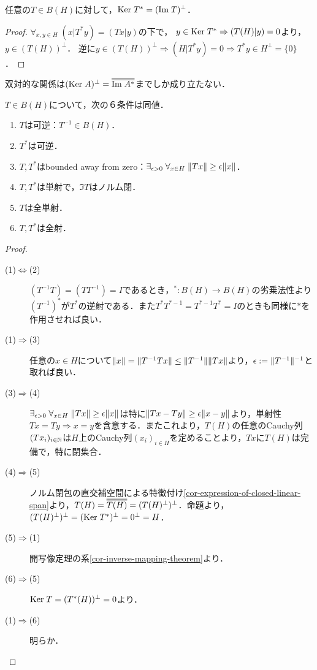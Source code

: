 \documentclass[uplatex,dvipdfmx]{jsreport}
\begin{document}
\begin{proposition}\label{prop-Ker-of-adjoint-operator}
    任意の$T\in B(H)$に対して，$\mathrm{Ker}\; T^*=(\mathrm{Im}\; T)^\perp$．
\end{proposition}
\begin{proof}
    $\forall_{x,y\in H}\;(x|T^*y)=(Tx|y)$の下で，
    $y\in\mathrm{Ker}\; T^*\Rightarrow (T(H)|y)=0$より，$y\in(T(H))^\perp$．
    逆に$y\in(T(H))^\perp\Rightarrow (H|T^*y)=0\Rightarrow T^*y\in H^\perp=\{0\}$．
\end{proof}
\begin{remark}
    双対的な関係は$(\Ker A)^\perp=\oo{\Im A^*}$までしか成り立たない．
\end{remark}

\begin{proposition}\label{prop-characterization-of-invertibleness-of-operator}
    $T\in B(H)$について，次の６条件は同値．
    \begin{enumerate}
        \item $T$は可逆：$T^{-1}\in B(H)$．
        \item $T^*$は可逆．
        \item $T,T^*$はbounded away from zero：$\exists_{\epsilon>0}\;\forall_{x\in H}\;\|Tx\|\ge\epsilon\|x\|$．%
        \item $T,T^*$は単射で，$\Im T$はノルム閉．
        \item $T$は全単射．
        \item $T,T^*$は全射．
    \end{enumerate}
\end{proposition}
\begin{proof}\mbox{}
    \begin{description}
        \item[(1)$\Leftrightarrow$(2)] $(T^{-1}T)=(TT^{-1})=I$であるとき，${}^*:B(H)\to B(H)$の劣乗法性より$(T^{-1})^*$が$T^*$の逆射である．また$T^*T^{*-1}=T^{*-1}T^*=I$のときも同様に$*$を作用させれば良い．
        \item[(1)$\Rightarrow$(3)] 任意の$x\in H$について$\|x\|=\|T^{-1}Tx\|\le\|T^{-1}\|\|Tx\|$より，$\epsilon:=\|T^{-1}\|^{-1}$と取れば良い．
        \item[(3)$\Rightarrow$(4)] $\exists_{\epsilon>0}\;\forall_{x\in H}\;\|Tx\|\ge\epsilon\|x\|$は特に$\|Tx-Ty\|\ge\epsilon\|x-y\|$より，単射性$Tx=Ty\Rightarrow x=y$を含意する．またこれより，$T(H)$の任意のCauchy列$(Tx_i)_{i\in\mathbb{N}}$は$H$上のCauchy列$(x_i)_{i\in H}$を定めることより，$Tx$に$T(H)$は完備で，特に閉集合．
        \item[(4)$\Rightarrow$(5)] ノルム閉包の直交補空間による特徴付け\ref{cor-expression-of-closed-linear-span}より，$T(H)=\dbloverline{T(H)}=(T(H)^\perp)^\perp$．命題より，$(T(H)^\perp)^\perp=(\mathrm{Ker}\; T^*)^\perp=0^\perp=H$．
        \item[(5)$\Rightarrow$(1)] 開写像定理の系\ref{cor-inverse-mapping-theorem}より．
        \item[(6)$\Rightarrow$(5)] $\mathrm{Ker}\; T=(T^*(H))^\perp=0$より．
        \item[(1)$\Rightarrow$(6)] 明らか．
    \end{description}
\end{proof}
\end{document}
